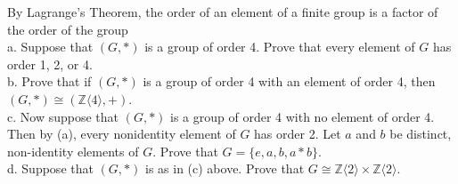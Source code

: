 By Lagrange's Theorem, the order of an element of a finite group is a factor of the order of the group\\

a. Suppose that $(G,*)$ is a group of order 4. Prove that every element of $G$ has order 1, 2, or 4.\\

b. Prove that if $(G,*)$ is a group of order 4 with an element of order 4, then
$(G,*)\cong(\mathbb{Z}\langle4\rangle,+)$.\\

c. Now suppose that $(G,*)$ is a group of order 4 with no element of order 4. Then by (a), every
nonidentity element of $G$ has order 2. Let $a$ and $b$ be distinct, non-identity elements of $G$. Prove
that $G=\{e,a,b,a*b\}$.\\

d. Suppose that $(G,*)$ is as in (c) above. Prove that
$G\cong\mathbb{Z}\langle2\rangle\times\mathbb{Z}\langle2\rangle$.\\\\

